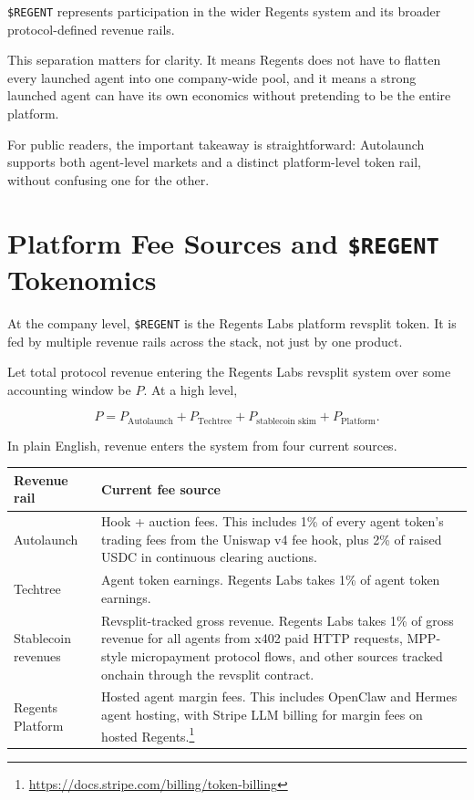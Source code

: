 \documentclass[11pt]{article}
\newcommand{\REGENT}{\texttt{\$REGENT}}
\newcommand{\USDC}{\textsc{USDC}}
\begin{document}
\REGENT{} represents participation in the wider Regents system and its broader protocol-defined revenue rails.

This separation matters for clarity. It means Regents does not have to flatten every launched agent into one company-wide pool, and it means a strong launched agent can have its own economics without pretending to be the entire platform.

For public readers, the important takeaway is straightforward: Autolaunch supports both agent-level markets and a distinct platform-level token rail, without confusing one for the other.

\section{Platform Fee Sources and \texorpdfstring{\REGENT}{\$REGENT} Tokenomics}

At the company level, \REGENT{} is the Regents Labs platform revsplit token. It is fed by multiple revenue rails across the stack, not just by one product.

Let total protocol revenue entering the Regents Labs revsplit system over some accounting window be \(P\). At a high level,

\begin{equation}
P = P_{\text{Autolaunch}} + P_{\text{Techtree}} + P_{\text{stablecoin skim}} + P_{\text{Platform}}.
\end{equation}

In plain English, revenue enters the system from four current sources.

\begin{table}[ht]
\centering
\begin{tabularx}{\textwidth}{@{}>{\raggedright\arraybackslash}p{}X@{}}
\toprule
\textbf{Revenue rail} & \textbf{Current fee source} \\
\midrule
Autolaunch & Hook + auction fees. This includes 1\% of every agent token's trading fees from the Uniswap v4 fee hook, plus 2\% of raised \USDC{} in continuous clearing auctions. \\
Techtree & Agent token earnings. Regents Labs takes 1\% of agent token earnings. \\
Stablecoin revenues & Revsplit-tracked gross revenue. Regents Labs takes 1\% of gross revenue for all agents from x402 paid HTTP requests, MPP-style micropayment protocol flows, and other sources tracked onchain through the revsplit contract. \\
Regents Platform & Hosted agent margin fees. This includes OpenClaw and Hermes agent hosting, with Stripe LLM billing for margin fees on hosted Regents.\footnote{\url{https://docs.stripe.com/billing/token-billing}} \\
\bottomrule
\end{tabularx}
\end{table}
\end{document}
